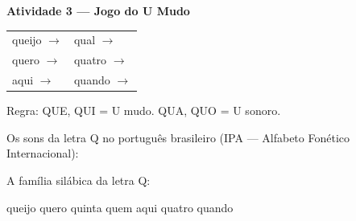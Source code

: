 \begin{consolidacao}
\textbf{Atividade 3 --- Jogo do U Mudo}


\begin{center}
\begin{tabular}{ll}
queijo \quad $\rightarrow$ \underline{\hspace{2cm}} & qual \quad $\rightarrow$ \underline{\hspace{2cm}} \\
quero \quad $\rightarrow$ \underline{\hspace{2cm}} & quatro \quad $\rightarrow$ \underline{\hspace{2cm}} \\
aqui \quad $\rightarrow$ \underline{\hspace{2cm}} & quando \quad $\rightarrow$ \underline{\hspace{2cm}}
\end{tabular}
\end{center}
Regra: QUE, QUI = U mudo. QUA, QUO = U sonoro.

\end{consolidacao}


\begin{sonsdaletra}
Os sons da letra Q no portugu\^es{} brasileiro (IPA --- Alfabeto Fon\'etico Internacional):

\end{sonsdaletra}


\begin{familiasilabica}
A fam\'ilia sil\'abica da letra Q:

\begin{center}
queijo \quad quero \quad quinta \quad quem \quad aqui \quad quatro \quad quando
\end{center}
\end{familiasilabica}


